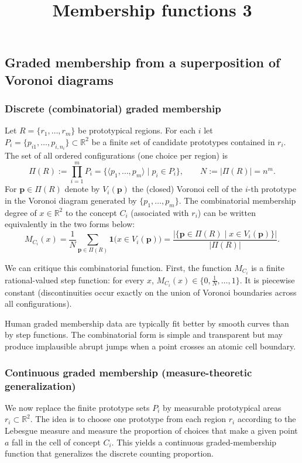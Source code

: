 \documentclass{article}
\title{Membership functions 3}
\begin{document}
\subsection{Graded membership from a superposition of Voronoi diagrams}

\subsubsection*{Discrete (combinatorial) graded membership}
Let \(R=\{r_1,\dots,r_m\}\) be prototypical regions. For each \(i\) let \(P_i=\{p_{i1},\dots,p_{i,n_i}\}\subset\mathbb{R}^2\) be a finite set of candidate prototypes contained in \(r_i\). The set of all ordered configurations (one choice per region) is
\[
\Pi(R):=\prod_{i=1}^m P_i=\{\langle p_1,\dots,p_m\rangle \mid p_i\in P_i\},
\qquad N:=|\Pi(R)|= n^m.
\]
For \(\mathbf p\in\Pi(R)\) denote by \(V_i(\mathbf p)\) the (closed) Voronoi cell of the \(i\)-th prototype in the Voronoi diagram generated by \(\{p_1,\dots,p_m\}\). The combinatorial membership degree of \(x\in\mathbb{R}^2\) to the concept \(C_i\) (associated with \(r_i\)) can be written equivalently in the two forms below:
\[
M_{C_i}(x)
= \frac{1}{N}\sum_{\mathbf p\in\Pi(R)} \mathbf{1}\big(x\in V_i(\mathbf p)\big)
= \frac{\big|\{\mathbf p\in\Pi(R)\mid x\in V_i(\mathbf p)\}\big|}{|\Pi(R)|}.
\]

We can critique this combinatorial function.
First, the function \(M_{C_i}\) is a finite rational-valued step function: for every \(x\), \(M_{C_i}(x)\in\{0,\frac{1}{N},\dots,1\}\). It is piecewise constant (discontinuities occur exactly on the union of Voronoi boundaries across all configurations).

Human graded membership data are typically fit better by smooth curves than by step functions. The combinatorial form is simple and transparent but may produce implausible abrupt jumps when a point crosses an atomic cell boundary.

\subsubsection*{Continuous graded membership (measure-theoretic generalization)}
We now replace the finite prototype sets \(P_i\) by measurable prototypical areas \(r_i\subset\mathbb{R}^2\). The idea is to choose one prototype from each region \(r_i\) according to the Lebesgue measure and measure the proportion of choices that make a given point \(a\) fall in the cell of concept \(C_i\). This yields a continuous graded-membership function that generalizes the discrete counting proportion.
\end{document}
